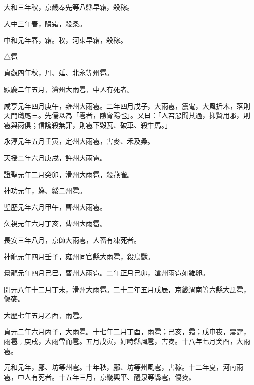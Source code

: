 \begin{pinyinscope}
 大和三年秋，京畿奉先等八縣早霜，殺稼。



 大中三年春，隕霜，殺桑。



 中和元年春，霜。秋，河東早霜，殺稼。



 △雹



 貞觀四年秋，丹、延、北永等州雹。



 顯慶二年五月，滄州大雨雹，中人有死者。



 咸亨元年四月庚午，雍州大雨雹。二年四月戊子，大雨雹，震電，大風折木，落則天門鴟尾三。先儒以為「雹者，陰脅陽也」。又曰：「人君惡聞其過，抑賢用邪，則雹與雨俱；信讒殺無罪，則雹下毀瓦、破車、殺牛馬。」



 永淳元年五月壬寅，定州大雨雹，害麥、禾及桑。



 天授二年六月庚戌，許州大雨雹。



 證聖元年二月癸卯，滑州大雨雹，殺燕雀。



 神功元年，媯、綏二州雹。



 聖歷元年六月甲午，曹州大雨雹。



 久視元年六月丁亥，曹州大雨雹。



 長安三年八月，京師大雨雹，人畜有凍死者。



 神龍元年四月壬子，雍州同官縣大雨雹，殺鳥獸。



 景龍元年四月己巳，曹州大雨雹。二年正月己卯，滄州雨雹如雞卵。



 開元八年十二月丁未，滑州大雨雹。二十二年五月戊辰，京畿渭南等六縣大風雹，傷麥。



 大歷七年五月乙酉，雨雹。



 貞元二年六月丙子，大雨雹。十七年二月丁酉，雨雹；己亥，霜；戊申夜，震霆，雨雹；庚戌，大雨雪而雹。五月戊寅，好畤縣風雹，害麥。十八年七月癸酉，大雨雹。



 元和元年，鄜、坊等州雹。十年秋，鄜、坊等州風雹，害稼。十二年夏，河南雨雹，中人有死者。十五年三月，京畿興平、醴泉等縣雹，傷麥。




\end{pinyinscope}
